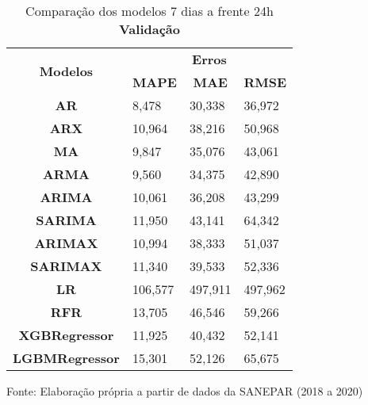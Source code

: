 \begin{table}[H]
	\centering
	\caption{Comparação dos modelos 7 dias a frente 24h \textbf{Validação} }\label{tb:10-24vld}
	\begin{tabular}{@{}clll@{}}
		\toprule
		\multirow{2}{*}{\textbf{Modelos}} & \multicolumn{3}{c}{\textbf{Erros}}                                                                       \\ \cmidrule(l){2-4} 
		& \multicolumn{1}{c}{\textbf{MAPE}} & \multicolumn{1}{c}{\textbf{MAE}} & \multicolumn{1}{c}{\textbf{RMSE}} \\ \hline
\textbf{AR}                       & 8,478                             & 30,338                           & 36,972                            \\
\textbf{ARX}                      & 10,964                            & 38,216                           & 50,968                            \\
\textbf{MA}                       & 9,847                             & 35,076                           & 43,061                            \\
\textbf{ARMA}                     & 9,560                             & 34,375                           & 42,890                            \\
\textbf{ARIMA}                    & 10,061                            & 36,208                           & 43,299                            \\
\textbf{SARIMA}                   & 11,950                            & 43,141                           & 64,342                            \\
\textbf{ARIMAX}                   & 10,994                            & 38,333                           & 51,037                            \\
\textbf{SARIMAX}                  & 11,340                            & 39,533                           & 52,336                            \\
\textbf{LR}        & 106,577                           & 497,911                          & 497,962                           \\
\textbf{RFR}  & 13,705                            & 46,546                           & 59,266                            \\
\textbf{XGBRegressor}             & 11,925                            & 40,432                           & 52,141                            \\
\textbf{LGBMRegressor}            & 15,301                            & 52,126                           & 65,675                            \\ \bottomrule
	\end{tabular}

Fonte: Elaboração própria a partir de dados da SANEPAR (2018 a 2020)
\end{table}

